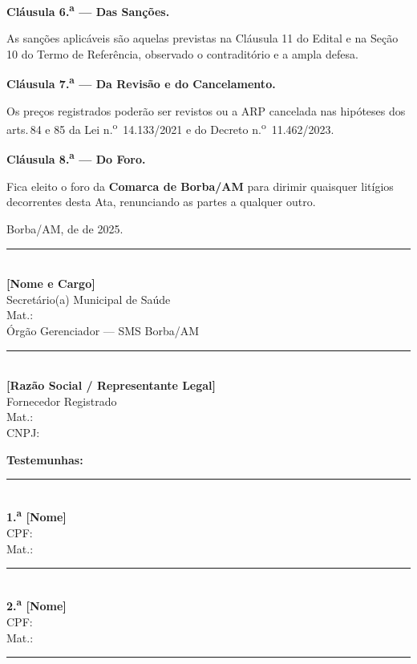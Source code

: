 \documentclass[12pt,a4paper]{article}
\newcommand{\clausula}[1]{\vspace{6pt}\noindent\textbf{Cláusula #1.}}
\newcommand{\assinatura}[3]{%
  \begin{center}\vspace{0.2cm}
  \rule{7cm}{0.5pt}\\[3pt]
  \textbf{#1}\\\small #2\\\small Mat.: \underline{\hspace{2cm}}\\\small #3
  \end{center}}
\newcommand{\exercicio}{2025}
\begin{document}
\bigskip
\clausula{6.\textsuperscript{a} --- Das Sanções}

As sanções aplicáveis são aquelas previstas na Cláusula 11 do Edital e na
Seção 10 do Termo de Referência, observado o contraditório e a ampla defesa.

\bigskip
\clausula{7.\textsuperscript{a} --- Da Revisão e do Cancelamento}

Os preços registrados poderão ser revistos ou a ARP cancelada nas hipóteses
dos arts.\,84 e 85 da Lei n.\textsuperscript{o}~14.133/2021 e do Decreto
n.\textsuperscript{o}~11.462/2023.

\bigskip
\clausula{8.\textsuperscript{a} --- Do Foro}

Fica eleito o foro da \textbf{Comarca de Borba/AM} para dirimir quaisquer
litígios decorrentes desta Ata, renunciando as partes a qualquer outro.

\vspace{1.5cm}
\noindent\hfill Borba/AM, \underline{\hspace{1cm}} de
\underline{\hspace{2.5cm}} de \exercicio.

\vspace{1.2cm}
\begin{minipage}{0.47\linewidth}
\assinatura{[Nome e Cargo]}{Secretário(a) Municipal de Saúde}{Órgão Gerenciador --- SMS Borba/AM}
\end{minipage}
\hfill
\begin{minipage}{0.47\linewidth}
\assinatura{[Razão Social / Representante Legal]}{Fornecedor Registrado}{CNPJ: \underline{\hspace{2.5cm}}}
\end{minipage}

\vspace{1.5cm}
\noindent\textbf{Testemunhas:}

\vspace{0.5cm}
\begin{minipage}{0.47\linewidth}
\assinatura{1.\textsuperscript{a} [Nome]}{CPF: \underline{\hspace{2.5cm}}}{}
\end{minipage}
\hfill
\begin{minipage}{0.47\linewidth}
\assinatura{2.\textsuperscript{a} [Nome]}{CPF: \underline{\hspace{2.5cm}}}{}
\end{minipage}

\vspace{1.5cm}
\noindent\textcolor{navy!30}{\rule{\linewidth}{0.5pt}}
\end{document}
